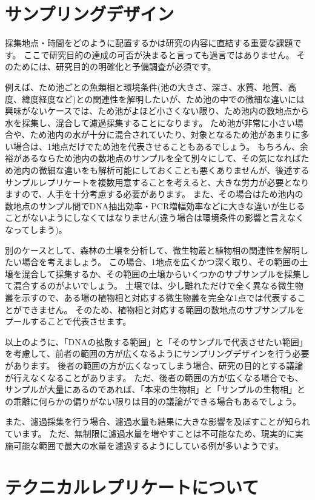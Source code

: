 \documentclass[titlepage,10pt,a4paper,uplatex]{jsbook}
\begin{document}
\section{サンプリングデザイン}

採集地点・時間をどのように配置するかは研究の内容に直結する重要な課題です。
ここで研究目的の達成の可否が決まると言っても過言ではありません。
そのためには、研究目的の明確化と予備調査が必須です。

例えば、ため池ごとの魚類相と環境条件(池の大きさ、深さ、水質、地質、高度、緯度経度など)との関連性を解明したいが、ため池の中での微細な違いには興味がないケースでは、ため池がよほど小さくない限り、ため池内の数地点から水を採集し、混合して濾過採集することになります。
ため池が非常に小さい場合や、ため池内の水が十分に混合されていたり、対象となるため池があまりに多い場合は、1地点だけでため池を代表させることもあるでしょう。
もちろん、余裕があるならため池内の数地点のサンプルを全て別々にして、その気になればため池内の微細な違いをも解析可能にしておくことも悪くありませんが、後述するサンプルレプリケートを複数用意することを考えると、大きな労力が必要となりますので、人手を十分考慮する必要があります。
また、その場合はため池内の数地点のサンプル間でDNA抽出効率・PCR増幅効率などに大きな違いが生じることがないようにしなくてはなりません(違う場合は環境条件の影響と言えなくなってしまう)。

別のケースとして、森林の土壌を分析して、微生物叢と植物相の関連性を解明したい場合を考えましょう。
この場合、1地点を広くかつ深く取り、その範囲の土壌を混合して採集するか、その範囲の土壌からいくつかのサブサンプルを採集して混合するのがよいでしょう。
土壌では、少し離れただけで全く異なる微生物叢を示すので、ある場の植物相と対応する微生物叢を完全な1点では代表することができません。
そのため、植物相と対応する範囲の数地点のサブサンプルをプールすることで代表させます。

以上のように、「DNAの拡散する範囲」と「そのサンプルで代表させたい範囲」を考慮して、前者の範囲の方が広くなるようにサンプリングデザインを行う必要があります。
後者の範囲の方が広くなってしまう場合、研究の目的とする議論が行えなくなることがあります。
ただ、後者の範囲の方が広くなる場合でも、サンプルが大量にあるのであれば、「本来の生物相」と「サンプルの生物相」との乖離に何らかの偏りがない限りは目的の議論ができる場合もあるでしょう。

また、濾過採集を行う場合、濾過水量も結果に大きな影響を及ぼすことが知られています。
ただ、無制限に濾過水量を増やすことは不可能なため、現実的に実施可能な範囲で最大の水量を濾過するようにしている例が多いようです。

\section{テクニカルレプリケートについて}
\end{document}
